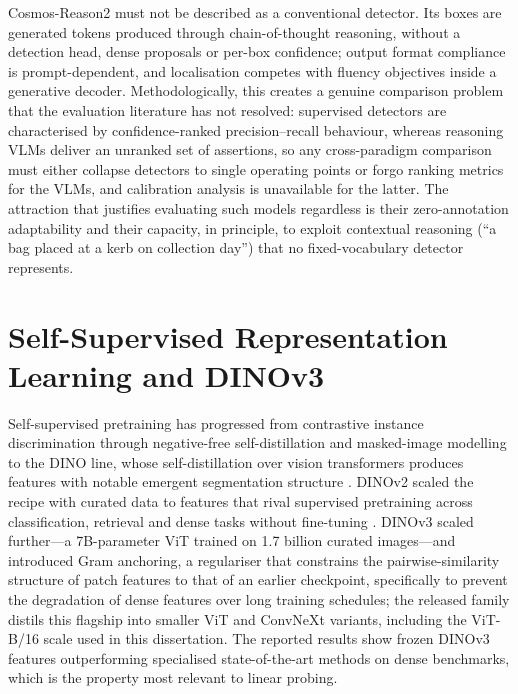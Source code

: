 Cosmos-Reason2 must not be described as a conventional detector. Its boxes are generated tokens produced through chain-of-thought reasoning, without a detection head, dense proposals or per-box confidence; output format compliance is prompt-dependent, and localisation competes with fluency objectives inside a generative decoder. Methodologically, this creates a genuine comparison problem that the evaluation literature has not resolved: supervised detectors are characterised by confidence-ranked precision--recall behaviour, whereas reasoning VLMs deliver an unranked set of assertions, so any cross-paradigm comparison must either collapse detectors to single operating points or forgo ranking metrics for the VLMs, and calibration analysis \citep{guo2017calibration} is unavailable for the latter. The attraction that justifies evaluating such models regardless is their zero-annotation adaptability and their capacity, in principle, to exploit contextual reasoning (``a bag placed at a kerb on collection day'') that no fixed-vocabulary detector represents.

\section{Self-Supervised Representation Learning and DINOv3}
\label{sec:lr-dinov3}

Self-supervised pretraining has progressed from contrastive instance discrimination \citep{chen2020simple,he2020momentum} through negative-free self-distillation \citep{grill2020bootstrap} and masked-image modelling \citep{he2022masked} to the DINO line, whose self-distillation over vision transformers produces features with notable emergent segmentation structure \citep{caron2021emerging}. DINOv2 scaled the recipe with curated data to features that rival supervised pretraining across classification, retrieval and dense tasks without fine-tuning \citep{oquab2024dinov2}. DINOv3 \citep{simeoni2025dinov3} scaled further---a 7B-parameter ViT trained on 1.7 billion curated images---and introduced Gram anchoring, a regulariser that constrains the pairwise-similarity structure of patch features to that of an earlier checkpoint, specifically to prevent the degradation of dense features over long training schedules; the released family distils this flagship into smaller ViT and ConvNeXt variants, including the ViT-B/16 scale used in this dissertation. The reported results show frozen DINOv3 features outperforming specialised state-of-the-art methods on dense benchmarks, which is the property most relevant to linear probing.

